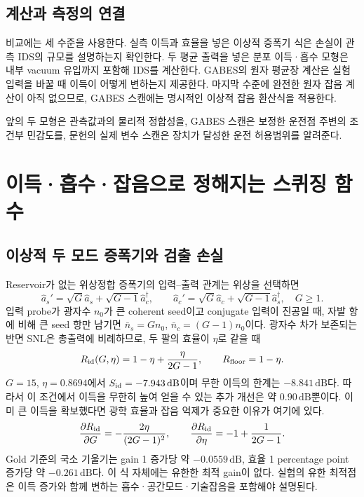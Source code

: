 \documentclass[11pt,a4paper]{article}
\newcommand{\dB}{\,\mathrm{dB}}
\begin{document}
\subsection{계산과 측정의 연결}
비교에는 세 수준을 사용한다. 실측 이득과 효율을 넣은 이상적 증폭기 식은
손실이 관측 IDS의 규모를 설명하는지 확인한다. 두 평균 출력을 넣은 분포
이득·흡수 모형은 내부 vacuum 유입까지 포함해 IDS를 계산한다.
GABES의 원자 평균장 계산은 실험 입력을 바꿀 때 이득이 어떻게 변하는지 제공한다.
마지막 수준에 완전한 원자 잡음 계산이 아직 없으므로, GABES 스캔에는
명시적인 이상적 잡음 환산식을 적용한다.

앞의 두 모형은 관측값과의 물리적 정합성을, GABES 스캔은 보정한 운전점
주변의 조건부 민감도를, 문헌의 실제 변수 스캔은 장치가 달성한 운전
허용범위를 알려준다.

\section{이득·흡수·잡음으로 정해지는 스퀴징 함수}
\subsection{이상적 두 모드 증폭기와 검출 손실}
Reservoir가 없는 위상정합 증폭기의 입력--출력 관계는 위상을 선택하면
\begin{equation}
 \hat a_s'=\sqrt G\hat a_s+\sqrt{G-1}\hat a_c^\dagger,\qquad
 \hat a_c'=\sqrt G\hat a_c+\sqrt{G-1}\hat a_s^\dagger,\quad G\geq1.
\end{equation}
입력 probe가 광자수 $n_0$가 큰 coherent seed이고 conjugate 입력이 진공일 때,
자발 항에 비해 큰 seed 항만 남기면 $\bar n_s=Gn_0$,
$\bar n_c=(G-1)n_0$이다. 광자수 차가 보존되는 반면 SNL은 총출력에
비례하므로, 두 팔의 효율이 $\eta$로 같을 때
\begin{equation}
 R_{\rm id}(G,\eta)=1-\eta+\frac{\eta}{2G-1},\qquad R_{\rm floor}=1-\eta.
 \label{eq:ideal}
\end{equation}
$G=15$, $\eta=0.8694$에서 $S_{\rm id}=-7.943\dB$이며 무한 이득의
한계는 $-8.841\dB$다. 따라서 이 조건에서 이득을 무한히 높여 얻을 수 있는
추가 개선은 약 $0.90\dB$뿐이다. 이미 큰 이득을 확보했다면 광학 효율과
잡음 억제가 중요한 이유가 여기에 있다.
\begin{equation}
 \frac{\partial R_{\rm id}}{\partial G}=-\frac{2\eta}{(2G-1)^2},\qquad
 \frac{\partial R_{\rm id}}{\partial\eta}=-1+\frac1{2G-1}.
\end{equation}
Gold 기준의 국소 기울기는 gain 1 증가당 약 $-0.0559\dB$,
효율 1 percentage point 증가당 약 $-0.261\dB$다. 이 식 자체에는
유한한 최적 gain이 없다. 실험의 유한 최적점은 이득 증가와 함께 변하는
흡수·공간모드·기술잡음을 포함해야 설명된다.
\end{document}
